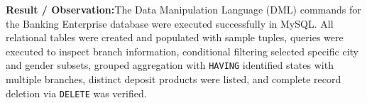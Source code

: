 \vspace{0.35cm}
\noindent\textbf{Result / Observation:}\quad The Data Manipulation Language (DML) commands for the Banking Enterprise database were executed successfully in MySQL. All relational tables were created and populated with sample tuples, queries were executed to inspect branch information, conditional filtering selected specific city and gender subsets, grouped aggregation with \texttt{HAVING} identified states with multiple branches, distinct deposit products were listed, and complete record deletion via \texttt{DELETE} was verified.
